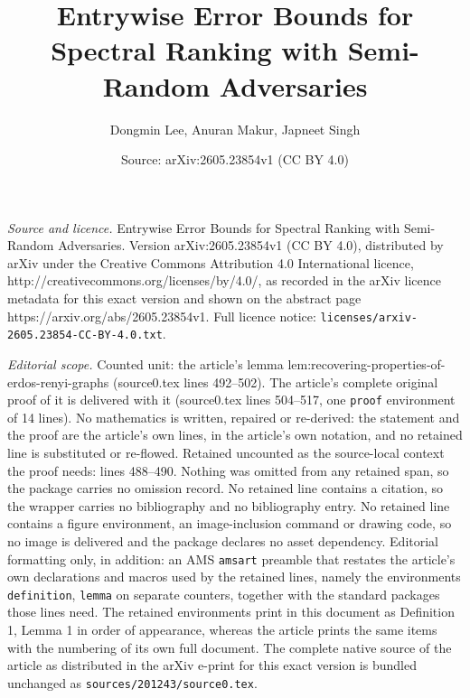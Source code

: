 \documentclass[10pt,a4paper]{amsart}
\title{Entrywise Error Bounds for Spectral Ranking with Semi-Random Adversaries}
\author{Dongmin Lee, Anuran Makur, Japneet Singh}
\date{Source: arXiv:2605.23854v1 (CC BY 4.0)}
\begin{document}
\maketitle

\noindent\emph{Source and licence.} Entrywise Error Bounds for Spectral Ranking with Semi-Random Adversaries. Version arXiv:2605.23854v1 (CC BY 4.0), distributed by arXiv under the Creative Commons Attribution 4.0 International licence, http://creativecommons.org/licenses/by/4.0/, as recorded in the arXiv licence metadata for this exact version and shown on the abstract page https://arxiv.org/abs/2605.23854v1. Full licence notice: \texttt{licenses/arxiv-2605.23854-CC-BY-4.0.txt}.\par\smallskip

\noindent\textit{Editorial scope.} Counted unit: the article's lemma lem:recovering-properties-of-erdos-renyi-graphs (source0.tex lines 492--502). The article's complete original proof of it is delivered with it (source0.tex lines 504--517, one \texttt{proof} environment of 14 lines). No mathematics is written, repaired or re-derived: the statement and the proof are the article's own lines, in the article's own notation, and no retained line is substituted or re-flowed.  Retained uncounted as the source-local context the proof needs: lines 488--490.  Nothing was omitted from any retained span, so the package carries no omission record.  No retained line contains a citation, so the wrapper carries no bibliography and no bibliography entry.  No retained line contains a figure environment, an image-inclusion command or drawing code, so no image is delivered and the package declares no asset dependency.  Editorial formatting only, in addition: an AMS \texttt{amsart} preamble that restates the article's own declarations and macros used by the retained lines, namely the environments \texttt{definition}, \texttt{lemma} on separate counters, together with the standard packages those lines need.  The retained environments print in this document as Definition 1, Lemma 1 in order of appearance, whereas the article prints the same items with the numbering of its own full document.  The complete native source of the article as distributed in the arXiv e-print for this exact version is bundled unchanged as \texttt{sources/201243/source0.tex}.
\end{document}
